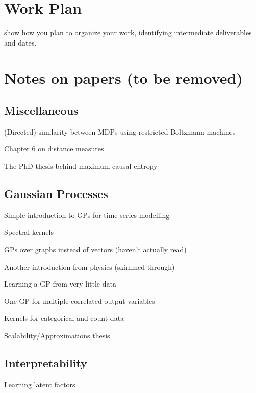 \documentclass{mprop}
\theoremstyle{definition}
\begin{document}
\section{Work Plan}

show how you plan to organize your work, identifying intermediate deliverables
and dates.

\section{Notes on papers (to be removed)}

\subsection{Miscellaneous}

(Directed) similarity between MDPs using restricted Boltzmann machines
\cite{9401f4eeb9a64c77afb3d087261d1080}

Chapter 6 on distance measures \cite{mccune2002analysis}

The PhD thesis behind maximum causal entropy \cite{Ziebart:2010:MPA:2049078}

\subsection{Gaussian Processes}

Simple introduction to GPs for time-series modelling \cite{Roberts2013GaussianPF}

Spectral kernels \cite{pmlr-v28-wilson13}

GPs over graphs instead of vectors (haven't actually read)
\cite{DBLP:journals/corr/abs-1803-05776}

Another introduction from physics (skimmed through) \cite{introduction_to_gps}

Learning a GP from very little data \cite{DBLP:conf/nips/PlattBSWZ01}

One GP for multiple correlated output variables \cite{DBLP:journals/jcphy/BilionisZKL13}

Kernels for categorical and count data \cite{savitsky2011variable}

Scalability/Approximations thesis \cite{kth}

\subsection{Interpretability}

Learning latent factors \cite{DBLP:conf/nips/LiSE17}
\end{document}

